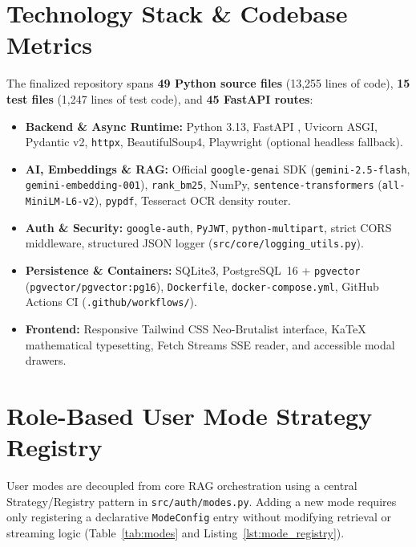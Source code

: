 \documentclass[12pt,a4paper,oneside]{report}
\begin{document}
\section{Technology Stack \& Codebase Metrics}
The finalized repository spans \textbf{49 Python source files} (13,255 lines of code), \textbf{15 test files} (1,247 lines of test code), and \textbf{45 FastAPI routes}:
\begin{itemize}[itemsep=2pt]
    \item \textbf{Backend \& Async Runtime:} Python 3.13, FastAPI \cite{fastapi}, Uvicorn ASGI, Pydantic v2, \texttt{httpx}, BeautifulSoup4, Playwright (optional headless fallback).
    \item \textbf{AI, Embeddings \& RAG:} Official \texttt{google-genai} SDK (\texttt{gemini-2.5-flash}, \texttt{gemini-embedding-001}), \texttt{rank\_bm25}, NumPy, \texttt{sentence-transformers} (\texttt{all-MiniLM-L6-v2}), \texttt{pypdf}, Tesseract OCR density router.
    \item \textbf{Auth \& Security:} \texttt{google-auth}, \texttt{PyJWT}, \texttt{python-multipart}, strict CORS middleware, structured JSON logger (\texttt{src/core/logging\_utils.py}).
    \item \textbf{Persistence \& Containers:} SQLite3, PostgreSQL~16 + \texttt{pgvector} (\texttt{pgvector/pgvector:pg16}), \texttt{Dockerfile}, \texttt{docker-compose.yml}, GitHub Actions CI (\texttt{.github/workflows/}).
    \item \textbf{Frontend:} Responsive Tailwind CSS Neo-Brutalist interface, KaTeX mathematical typesetting, Fetch Streams SSE reader, and accessible modal drawers.
\end{itemize}

\section{Role-Based User Mode Strategy Registry}
User modes are decoupled from core RAG orchestration using a central Strategy/Registry pattern in \texttt{src/auth/modes.py}. Adding a new mode requires only registering a declarative \texttt{ModeConfig} entry without modifying retrieval or streaming logic (Table~\ref{tab:modes} and Listing~\ref{lst:mode_registry}).
\end{document}
